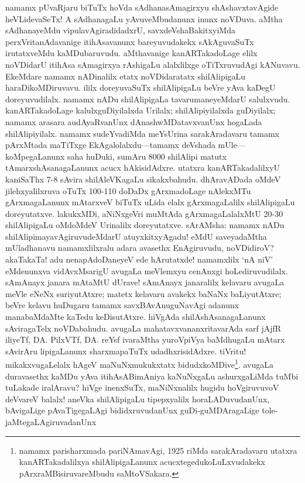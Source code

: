 \documentclass[11pt,a4size]{article}
\begin{document}
namamx pUvaRjaru biTuTx hoVda sAdhanasAmagirxyu shAshavxtavAgide
heVLidevaSeTx! A sAdhanagaLu yAvuveMbudanunx inunx noVDuva. aMtha
sAdhanayeMdu vipulavAgiradidadxrU, savxdeVshaBakitxyiMda
perxVritanAdavanige itihAsavanunx bareyuvudakekx sAkAguvaSuTx
irutatxveMdu kaMDubaruvudu. aMthavanige kanARTakadoLage elilx
noVDidarU itihAsa sAmagirxya rAshigaLu alalxlilxge oTiTxruvudAgi
kANuvavu. EkeMdare namamx nADinalilx etatx noVDidaratatx shilAlipigaLu
haraDikoMDiruvavu. ililx doreyuvaSuTx shilAlipigaLu beVre yAva kaDegU
doreyuvudilalx. namamx nADu shilAlipigaLa tavarumaneyeMdarU
salulxvudu. kanARTakadoLage kalulxguDiyilalxda Urilalx;
shilAlipiyilalxda guDiyilalx; namamx arasara audAyaRvanUnx
dAnashwMDatavxvanUnx hogaLada shilAlipiyilalx. namamx sudeYvadiMda
meYsUrina sarakAradavaru tamamx pArxMtada maTiTxge
EkAgalolalxdu---tamamx deVshada mUle---koMpegaLanunx saha huDuki,
sumAru 8000 shilAlipi matutx tAmarxshAsanagaLanunx acucx
hAkisidAdxre. utatxra kanARTakadalilxyU kaniSaThx 7-8 sAvira
shilAleVKagaLu sikakxbahudu. dhAravADada oMdeV jilehxyalilxruva oTuTx
100-110 doDaDx gArxmadoLage nAlekxMTu gArxmagaLanunx mAtarxveV biTuTx
uLida elalx gArxmagaLalilx shilAlipigaLu doreyutatxve. lakukxMDi,
aNiNxgeVri muMtAda gArxmagaLalalxMtU 20-30 shilAlipigaLu oMdoMdeV
Urinalilx doreyutatxve. sArAMsha: namamx nADu
shilAlipimayavAgiruvudeMdarU atuyxkitxyAgadu! eMdU saveyadaMtha
mUladhanavu namamxlilxralu adara avasethx EnAgiruvudu, noVDidiroV?
akaTakaTa! adu nenapAdoDaneyeV ede hArutatxde! namamxlilx `nA niV'
eMdenunxva vidAvxMsarigU avugaLa meVlemxyu cenAnxgi
hoLediruvudilalx. sAmAnayx janara mAtaMtU dUrave! sAmAnayx janaralilx
kelavaru avugaLa meVle eNeNx suriyutAtxre; matetx kelavaru avakekx
baNaNx baLiyutAtxre; beVre kelavu huDugaru tamamx savxBAvAnuguNavAgi
adanunx manabaMdaMte kaTedu keDisutAtxre. hiVgAda shilAshAsanagaLanunx
sAviragaTelx noVDabahudu. avugaLa mahatavxvananxritavarAda sarf jAjfR
iliyeTf, DA. PilxVTf, DA. reYsf ivaraMtha yuroVpiVya baMdhugaLu mAtarx
sAvirAru lipigaLanunx sharxmapaTuTx udadhxrisidAdxre. tiVritu!
mikakxvugaLelalx hAgeV maNuNxmukukxtatx
bidudxkoMDive\footnote[1]{namamx parisharxmada pariNAmavAgi, 1925
  riMda sarakAradavaru utatxra kanARTakadalilxya shilAlipigaLanunx
  acucxtegedukoLuLxvudakekx pArxraMBisiruvareMbudu
  saMtoVSakara.}. avugaLa duravasethx kaMDu yAva itihAsABimAniya
kaNuNxgaLu ashurxgaLiMda tuMbi tuLakade iralAravu? hiVge inenxSuTx,
maNiNxnalilx hugidu hoVgiruvuvoV deVvareV balalx! aneVka shilAlipigaLu
tipepxyalilx horaLADuvudanUnx, bAvigaLige pAvaTigegaLAgi
bididxruvudanUnx guDi-guMDAragaLige tole-jaMtegaLAgiruvadanUnx
\end{document}
